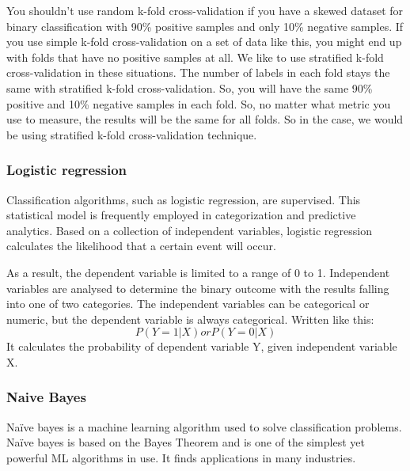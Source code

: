 You shouldn't use random k-fold cross-validation if you have a skewed dataset for binary classification with 90\% positive samples and only 10\% negative samples. If you use simple k-fold cross-validation on a set of data like this, you might end up with folds that have no positive samples at all. We like to use stratified k-fold cross-validation in these situations. The number of labels in each fold stays the same with stratified k-fold cross-validation. So, you will have the same 90\% positive and 10\% negative samples in each fold. So, no matter what metric you use to measure, the results will be the same for all folds. So in the case, we would be using stratified k-fold cross-validation technique.

\subsubsection{Logistic regression}
Classification algorithms, such as logistic regression, are supervised.
This statistical model is frequently employed in categorization and predictive analytics. Based on a collection of independent variables, logistic regression calculates the likelihood that a certain event will occur. 

As a result, the dependent variable is limited to a range of 0 to 1. 
Independent variables are analysed to determine the binary outcome with the results falling into one of two categories. The independent variables can be categorical or numeric, but the dependent variable is always categorical. Written like this: $$P(Y=1|X) or P(Y=0|X)$$
It calculates the probability of dependent variable Y, given independent variable X. 




\subsubsection{Naive Bayes}

Naïve bayes is a machine learning algorithm used to solve classification problems. Naïve bayes is based on the Bayes Theorem and is one of the simplest yet powerful ML algorithms in use. It finds applications in many industries.


